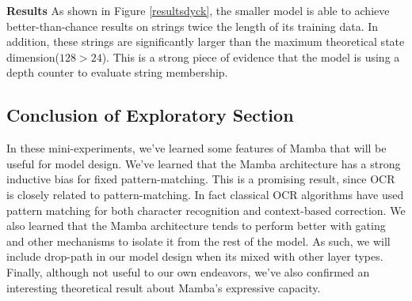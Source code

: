 \textbf{Results}
As shown in Figure \ref{resultsdyck}, the smaller model is able to achieve
better-than-chance results on strings twice the length of its training data.
In addition, these strings are significantly larger than the maximum theoretical
state dimension($128 > 24$).
This is a strong piece of evidence that the model is using a depth counter to
evaluate string membership.

\subsection{Conclusion of Exploratory Section}
In these mini-experiments, we've learned some features of Mamba that will be
useful for model design.
We've learned that the Mamba architecture has a strong inductive bias for
fixed pattern-matching.
This is a promising result, since OCR is closely related to pattern-matching.
In fact classical OCR algorithms have used pattern matching for both character
recognition and context-based
correction\cite{classicalocr,classicalocrincontext}.
We also learned that the Mamba architecture tends to perform better with gating
and other mechanisms to isolate it from the rest of the model. As such, we will
include drop-path in our model design when its mixed with other layer types.
Finally, although not useful to our own endeavors, we've also confirmed an
interesting theoretical result about Mamba's expressive capacity.
